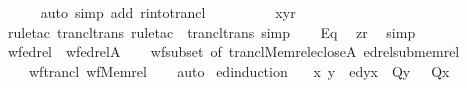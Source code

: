 \begin{isabellebody}
\ \ \ \ \isamarkupfalse%
\ {\isacharparenleft}{\kern0pt}auto\ simp\ add{\isacharcolon}{\kern0pt}\ r{\isacharunderscore}{\kern0pt}into{\isacharunderscore}{\kern0pt}trancl{\isacharparenright}{\kern0pt}\isanewline
\ \ \isamarkupfalse%
\ \ \isamarkupfalse%
\isanewline
\ \ \ \ {\isachardoublequoteopen}{\isasymlangle}x{\isacharcomma}{\kern0pt}y{\isasymrangle}{\isasymin}{\isacharquery}{\kern0pt}r{\isachardoublequoteclose}\isanewline
\ \ \ \ \isamarkupfalse%
\ {\isacharparenleft}{\kern0pt}rule{\isacharunderscore}{\kern0pt}tac\ trancl{\isacharunderscore}{\kern0pt}trans{\isacharcomma}{\kern0pt}\ rule{\isacharunderscore}{\kern0pt}tac\ {\isacharbrackleft}{\kern0pt}{}{\isacharbrackright}{\kern0pt}\ trancl{\isacharunderscore}{\kern0pt}trans{\isacharcomma}{\kern0pt}\ simp{\isacharparenright}{\kern0pt}\isanewline
\ \ \isamarkupfalse%
\ Eq{}\ \isamarkupfalse%
\ {\isachardoublequoteopen}z{\isasymin}{\isacharquery}{\kern0pt}r{\isachardoublequoteclose}\ \isamarkupfalse%
\ simp\isanewline
{}\isamarkupfalse%
%
\endisatagproof
{\isafoldproof}%
%
\isadelimproof
\isanewline
%
\endisadelimproof
\isanewline
{}\isamarkupfalse%
\ wf{\isacharunderscore}{\kern0pt}edrel\ {\isacharcolon}{\kern0pt}\ {\isachardoublequoteopen}wf{\isacharparenleft}{\kern0pt}edrel{\isacharparenleft}{\kern0pt}A{\isacharparenright}{\kern0pt}{\isacharparenright}{\kern0pt}{\isachardoublequoteclose}\isanewline
%
\isadelimproof
\ \ %
\endisadelimproof
%
\isatagproof
{}\isamarkupfalse%
\ wf{\isacharunderscore}{\kern0pt}subset\ {\isacharbrackleft}{\kern0pt}of\ {\isachardoublequoteopen}trancl{\isacharparenleft}{\kern0pt}Memrel{\isacharparenleft}{\kern0pt}eclose{\isacharparenleft}{\kern0pt}A{\isacharparenright}{\kern0pt}{\isacharparenright}{\kern0pt}{\isacharparenright}{\kern0pt}{\isachardoublequoteclose}{\isacharbrackright}{\kern0pt}\ edrel{\isacharunderscore}{\kern0pt}sub{\isacharunderscore}{\kern0pt}memrel\isanewline
\ \ \ \ wf{\isacharunderscore}{\kern0pt}trancl\ wf{\isacharunderscore}{\kern0pt}Memrel\isanewline
\ \ \isamarkupfalse%
\ auto%
\endisatagproof
{\isafoldproof}%
%
\isadelimproof
\isanewline
%
\endisadelimproof
\isanewline
{}\isamarkupfalse%
\ ed{\isacharunderscore}{\kern0pt}induction{\isacharcolon}{\kern0pt}\isanewline
\ \ \ {\isachardoublequoteopen}{\isasymAnd}x{\isachardot}{\kern0pt}\ {\isasymlbrakk}{\isasymAnd}y{\isachardot}{\kern0pt}\ \ ed{\isacharparenleft}{\kern0pt}y{\isacharcomma}{\kern0pt}x{\isacharparenright}{\kern0pt}\ {\isasymLongrightarrow}\ Q{\isacharparenleft}{\kern0pt}y{\isacharparenright}{\kern0pt}\ {\isasymrbrakk}\ {\isasymLongrightarrow}\ Q{\isacharparenleft}{\kern0pt}x{\isacharparenright}{\kern0pt}{\isachardoublequoteclose}\isanewline

\end{isabellebody}
